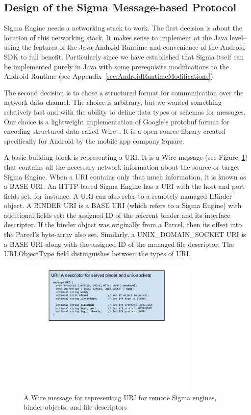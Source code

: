 \documentclass[prodmode]{acmlarge}
\begin{document}
\subsection{Design of the Sigma Message-based Protocol}
Sigma Engine needs a networking stack to work. The first decision is about the location of this networking stack. It makes sense to implement at the Java level--using the features of the Java Android Runtime and convenience of the Android SDK to full benefit. Particularly since we have established that Sigma itself can be implemented purely in Java with some prerequisite modifications to the Android Runtime (see Appendix~\ref{sec:AndroidRuntimeModifications}).

The second decision is to chose a structured format for communication over the network data channel. The choice is arbitrary, but we wanted something relatively fast and with the ability to define data types or schemas for messages. Our choice is a lightweight implementation of Google's protobuf format for encoding structured data called Wire~\cite{Wire,IntroWire}. It is a open source library created specifically for Android by the mobile app company Square.

A basic building block is representing a URI. It is a Wire message (see Figure~\ref{fig:WireURI}) that contains all the necessary network information about the source or target Sigma Engine. When a URI contains only that much information, it is known as a BASE URI. An HTTP-based Sigma Engine has a URI with the host and port fields set, for instance. A URI can also refer to a remotely managed IBinder object. A BINDER URI is a BASE URI (which refers to a Sigma Engine) with additional fields set: the assigned ID of the referent binder and its interface descriptor. If the binder object was originally from a Parcel, then its offset into the Parcel's byte-array also set. Similarly, a UNIX\_DOMAIN\_SOCKET URI is a BASE URI along with the assigned ID of the managed file descriptor. The URI.ObjectType field distinguishes between the types of URI.

\begin{figure}[h!]
\centering
\includegraphics[width=0.8\textwidth]{drawings/WireURI.pdf}
\caption{A Wire message for representing URI for remote Sigma engines, binder objects, and file descriptors}
\label{fig:WireURI}
\end{figure}
\end{document}
